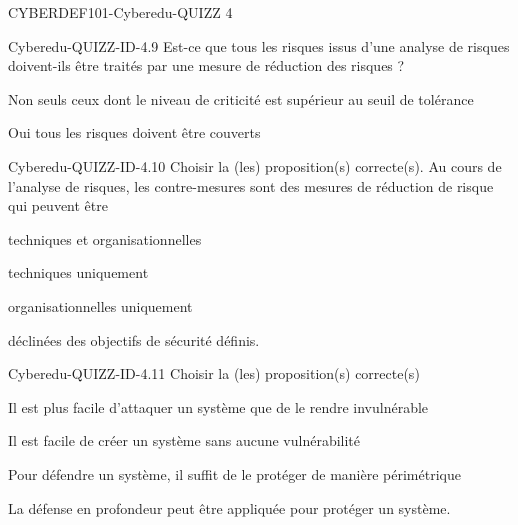\documentclass[12pt]{article}
\begin{document}
\begin{quiz}{CYBERDEF101-Cyberedu-QUIZZ 4}
\begin{multi}[multiple=true]{Cyberedu-QUIZZ-ID-4.9}
Est-ce que tous les risques issus d'une analyse de risques doivent-ils \^etre trait\'es par une mesure de r\'eduction des risques ?
\item* Non seuls ceux dont le niveau de criticit\'e est sup\'erieur au seuil de tol\'erance
\item Oui tous les risques doivent \^etre couverts
\end{multi}
\begin{multi}[multiple=true]{Cyberedu-QUIZZ-ID-4.10}
Choisir la (les) proposition(s) correcte(s). Au cours de l'analyse de risques, les contre-mesures sont des mesures de r\'eduction de risque qui peuvent \^etre 
\item*	techniques et organisationnelles 
\item	techniques uniquement 
\item	organisationnelles uniquement 
\item* d\'eclin\'ees des objectifs de s\'ecurit\'e d\'efinis.
\end{multi}
\begin{multi}[multiple=true]{Cyberedu-QUIZZ-ID-4.11}
Choisir la (les) proposition(s) correcte(s) 
\item*	Il est plus facile d'attaquer un syst\`eme que de le rendre invuln\'erable 
\item	Il est facile de cr\'eer un syst\`eme sans aucune vuln\'erabilit\'e 
\item	Pour d\'efendre un syst\`eme, il suffit de le prot\'eger de mani\`ere p\'erim\'etrique 
\item*	La d\'efense en profondeur peut \^etre appliqu\'ee pour prot\'eger un syst\`eme.
\end{multi}



\end{quiz}
\end{document}
